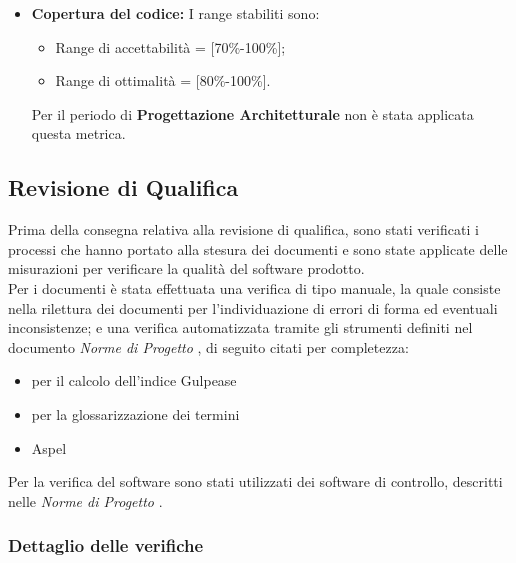 \begin{itemize}
\item \textbf{Copertura del codice: }I range stabiliti sono:
      \begin{itemize}
        \item Range di accettabilità = [70\%-100\%];
        \item Range di ottimalità = [80\%-100\%].
      \end{itemize}
Per il periodo di \textbf{Progettazione Architetturale} non è stata applicata questa metrica.

\end{itemize} 





\subsection{Revisione di Qualifica}
  Prima della consegna relativa alla revisione di qualifica, sono stati verificati i processi che hanno portato alla stesura dei documenti e sono state applicate delle misurazioni per verificare la qualità del software prodotto. \\
  Per i documenti è stata effettuata una verifica di tipo manuale, la quale consiste nella rilettura dei documenti per l'individuazione di errori di forma ed eventuali inconsistenze;
  e una verifica automatizzata tramite gli strumenti definiti nel documento \emph{Norme di Progetto \VersioneNP{}}, di seguito citati per completezza:
  \begin{itemize}
    \item {}  per il calcolo dell’indice Gulpease
    \item {}  per la glossarizzazione dei termini
    \item Aspel
  \end{itemize}
  Per la verifica del software sono stati utilizzati dei software di controllo, descritti nelle \emph{Norme di Progetto \VersioneNP{}}.
  \subsubsection{Dettaglio delle verifiche}

